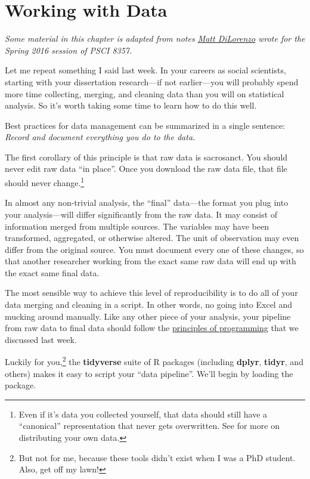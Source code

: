 \documentclass[12pt,oneside,openany]{book}
\let\rmarkdownfootnote\footnote%
\def\footnote{\protect\rmarkdownfootnote}
\begin{document}
\chapter{Working with Data}\label{data}

\emph{Some material in this chapter is adapted from notes
\href{http://mdilorenzo.github.io}{Matt DiLorenzo} wrote for the Spring
2016 session of PSCI 8357.}

Let me repeat something I said last week. In your careers as social
scientists, starting with your dissertation research---if not
earlier---you will probably spend more time collecting, merging, and
cleaning data than you will on statistical analysis. So it's worth
taking some time to learn how to do this well.

Best practices for data management can be summarized in a single
sentence: \emph{Record and document everything you do to the data.}

The first corollary of this principle is that raw data is sacrosanct.
You should never edit raw data ``in place''. Once you download the raw
data file, that file should never change.\footnote{Even if it's data you
  collected yourself, that data should still have a ``canonical''
  representation that never gets overwritten. See \citet{Leek:2015uw}
  for more on distributing your own data.}

In almost any non-trivial analysis, the ``final'' data---the format you
plug into your analysis---will differ significantly from the raw data.
It may consist of information merged from multiple sources. The
variables may have been transformed, aggregated, or otherwise altered.
The unit of observation may even differ from the original source. You
must document every one of these changes, so that another researcher
working from the exact same raw data will end up with the exact same
final data.

The most sensible way to achieve this level of reproducibility is to do
all of your data merging and cleaning in a script. In other words, no
going into Excel and mucking around manually. Like any other piece of
your analysis, your pipeline from raw data to final data should follow
the \protect\hyperlink{programming}{principles of programming} that we
discussed last week.

Luckily for you,\footnote{But not for me, because these tools didn't
  exist when I was a PhD student. Also, get off my lawn!} the
\textbf{tidyverse} suite of R packages (including \textbf{dplyr},
\textbf{tidyr}, and others) makes it easy to script your ``data
pipeline''. We'll begin by loading the package.
\end{document}
